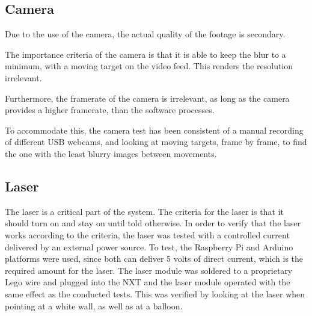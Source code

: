 \subsection*{Camera}
Due to the use of the camera, the actual quality of the footage is secondary.

The importance criteria of the camera is that it is able to keep the blur to a minimum, with a moving target on the video feed.
This renders the resolution irrelevant.

Furthermore, the framerate of the camera is irrelevant, as long as the camera provides a higher framerate, than the software processes.

To accommodate this, the camera test has been consistent of a manual recording of different USB webcams, and looking at moving targets, frame by frame, to find the one with the least blurry images between movements.

\subsection*{Laser}
The laser is a critical part of the system.
The criteria for the laser is that it should turn on and stay on until told otherwise. 
In order to verify that the laser works according to the criteria, the laser was tested with a controlled current delivered by an external power source.
To test, the Raspberry Pi and Arduino platforms were used, since both can deliver 5 volts of direct current, which is the required amount for the laser\cite{LaserDatasheet}.
The laser module was soldered to a proprietary Lego wire and plugged into the NXT and the laser module operated with the same effect as the conducted tests. 
This was verified by looking at the laser when pointing at a white wall, as well as at a balloon.
